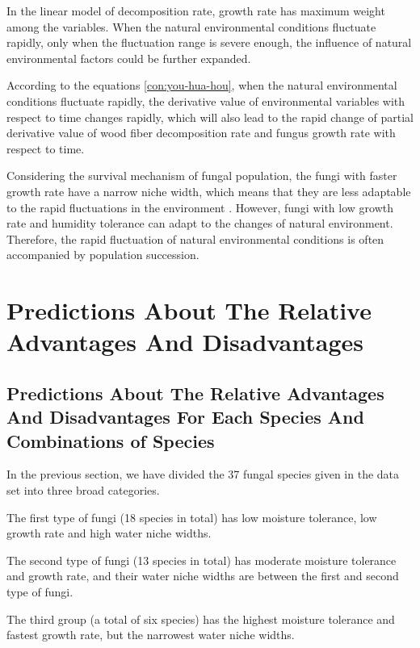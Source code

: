 \documentclass[12pt]{article}
\begin{document}
In the linear model of decomposition rate, growth rate has maximum weight among the variables. When the natural environmental conditions fluctuate rapidly, only when the fluctuation range is severe enough, the influence of natural environmental factors could be further expanded.

According to the equations \ref{con:you-hua-hou}, when the natural environmental conditions fluctuate rapidly, the derivative value of environmental variables with respect to time changes rapidly, which will also lead to the rapid change of partial derivative value of wood fiber decomposition rate and fungus growth rate with respect to time.

Considering the survival mechanism of fungal population, the fungi with faster growth rate have a narrow niche width, which means that they are less adaptable to the rapid fluctuations in the environment . However, fungi with low growth rate and humidity tolerance can adapt to the changes of natural environment. Therefore, the rapid fluctuation of natural environmental conditions is often accompanied by population succession.









\section{Predictions About The Relative Advantages And Disadvantages}
\subsection{Predictions About The Relative Advantages And Disadvantages For Each Species And Combinations of Species}
In the previous section, we have divided the 37 fungal species given in the data set into three broad categories.\par 

The first type of fungi (18 species in total) has low moisture tolerance, low growth rate and high water niche widths.\par 

The second type of fungi (13 species in total) has moderate moisture tolerance and growth rate, and their water niche widths are between the first and second type of fungi.\par 

The third group (a total of six species) has the highest moisture tolerance and fastest growth rate, but the narrowest water niche widths.\par 
\end{document}
